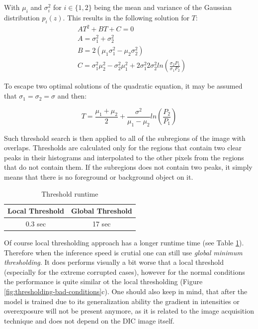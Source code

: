 With $\mu_i$ and $\sigma_i^2$ for $i \in \{1, 2\}$ being the mean and variance of the Gaussian distribution $p_i(z)$. This results in the following solution for $T$:
\begin{equation}
    \begin{split}
        &AT^2 + BT + C = 0 \\
        &A = \sigma_1^2 + \sigma_2^2 \\
        &B = 2(\mu_1 \sigma_1^2 - \mu_2 \sigma_2^2) \\
        &C = \sigma_1^2 \mu_2^2 - \sigma_2^2 \mu_1^2 + 2\sigma_1^2 2\sigma_2^2ln\left(\frac{\sigma_2P_1}{\sigma_1P_2}\right)
    \end{split}
\end{equation}

To escape two optimal solutions of the quadratic equation, it may be assumed that $\sigma_1 = \sigma_2 = \sigma$ and then:

\begin{equation}
    T = \frac{\mu_1 + \mu_2}{2} + \frac{\sigma^2}{\mu_1 - \mu_2}ln\left(\frac{P_2}{P_1}\right)
\end{equation}

Such threshold search is then applied to all of the subregions of the image with overlaps. Thresholds are calculated only for the regions that contain two clear peaks in their histograms and interpolated to the other pixels from the regions that do not contain them. If the subregions does not contain two peaks, it simply means that there is no foreground or background object on it. 

\begin{table}[htb]
  \centering
      \begin{tabular}{||c c||} 
       \hline
       Local Threshold & Global Threshold \\ [0.5ex] 
       \hline\hline
       0.3 sec & 17 sec  \\ 
       \hline
      \end{tabular}
      \caption{Threshold runtime}
      \label{table:threshold-timing}
  \end{table}
  
Of course local thresholding approach has a longer runtime time (see Table \ref{table:threshold-timing}). Therefore when the inference speed is crutial one can still use \textit{global minimum thresholding}. It does performs visually a bit worse that a local threshold (especially for the extreme corrupted cases), however for the normal conditions the performance is quite similar ot the local thresholding (Figure \ref{fig:thresholding-bad-conditions}c). One should also keep in mind, that after the model is trained due to its generalization ability the gradient in intensities or overexposure will not be present anymore, as it is related to the image acquisition technique and does not depend on the DIC image itself.


